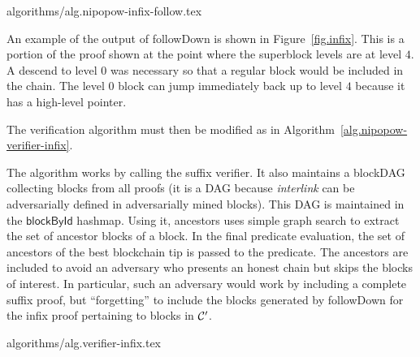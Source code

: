 {algorithms/alg.nipopow-infix-follow.tex}

An example of the output of \textsf{followDown} is shown in
Figure~\ref{fig.infix}. This is a portion of the proof shown at the point where
the superblock levels are at level $4$. A descend to level $0$ was necessary so
that a regular block would be included in the chain. The level $0$ block can
jump immediately back up to level $4$ because it has a high-level pointer.

The verification algorithm must then be modified as in
Algorithm~\ref{alg.nipopow-verifier-infix}.

The algorithm works by calling the suffix verifier. It also maintains a blockDAG
collecting blocks from all proofs (it is a DAG because \emph{interlink} can be
adversarially defined in adversarially mined blocks). This DAG is maintained in
the $\textsf{blockById}$ hashmap. Using it, \textsf{ancestors} uses simple graph
search to extract the set of ancestor blocks of a block. In the final predicate
evaluation, the set of ancestors of the best blockchain tip is passed to the
predicate. The ancestors are included to avoid an adversary who presents an
honest chain but skips the blocks of interest. In particular, such an adversary
would work by including a complete suffix proof, but ``forgetting'' to include
the blocks generated by \textsf{followDown} for the infix proof pertaining to
blocks in $\mathcal{C}'$.

{algorithms/alg.verifier-infix.tex}
